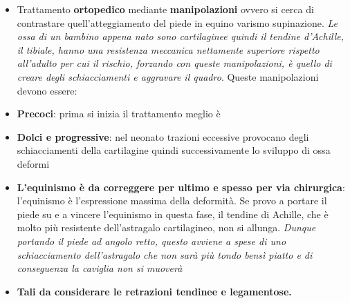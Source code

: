 \documentclass[]{article}
\begin{document}
\begin{itemize}
\item
  Trattamento \textbf{ortopedico} mediante \textbf{manipolazioni} ovvero
  si cerca di contrastare quell'atteggiamento del piede in equino
  varismo supinazione. \emph{Le ossa di un bambino appena nato sono
  cartilaginee quindi il tendine d'Achille, il tibiale, hanno una
  resistenza meccanica nettamente superiore rispetto all'adulto per cui
  il rischio, forzando con queste manipolazioni, è quello di creare
  degli schiacciamenti e aggravare il quadro}. Queste manipolazioni
  devono essere:
\end{itemize}

\begin{itemize}
\item
  \textbf{Precoci}: prima si inizia il trattamento meglio è
\item
  \textbf{Dolci e progressive}: nel neonato trazioni eccessive provocano
  degli schiacciamenti della cartilagine quindi successivamente lo
  sviluppo di ossa deformi
\item
  \textbf{L'equinismo è da correggere per ultimo e spesso per via
  chirurgica}: l'equinismo è l'espressione massima della deformità. Se
  provo a portare il piede su e a vincere l'equinismo in questa fase, il
  tendine di Achille, che è molto più resistente dell'astragalo
  cartilagineo, non si allunga. \emph{Dunque portando il piede ad angolo
  retto, questo avviene a spese di uno schiacciamento dell'astragalo che
  non sarà più tondo bensì piatto e di conseguenza la caviglia non si
  muoverà}
\item
  \textbf{Tali da considerare le retrazioni tendinee e legamentose.}
\end{itemize}
\end{document}
